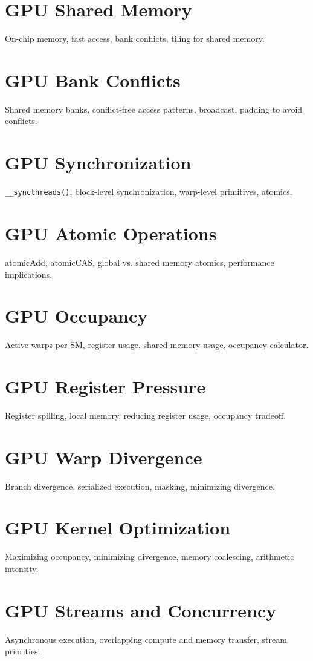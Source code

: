 \chapter{GPU Shared Memory}
On-chip memory, fast access, bank conflicts, tiling for shared memory.

\chapter{GPU Bank Conflicts}
Shared memory banks, conflict-free access patterns, broadcast, padding to avoid conflicts.

\chapter{GPU Synchronization}
\texttt{\_\_syncthreads()}, block-level synchronization, warp-level primitives, atomics.

\chapter{GPU Atomic Operations}
atomicAdd, atomicCAS, global vs. shared memory atomics, performance implications.

\chapter{GPU Occupancy}
Active warps per SM, register usage, shared memory usage, occupancy calculator.

\chapter{GPU Register Pressure}
Register spilling, local memory, reducing register usage, occupancy tradeoff.

\chapter{GPU Warp Divergence}
Branch divergence, serialized execution, masking, minimizing divergence.

\chapter{GPU Kernel Optimization}
Maximizing occupancy, minimizing divergence, memory coalescing, arithmetic intensity.

\chapter{GPU Streams and Concurrency}
Asynchronous execution, overlapping compute and memory transfer, stream priorities.

